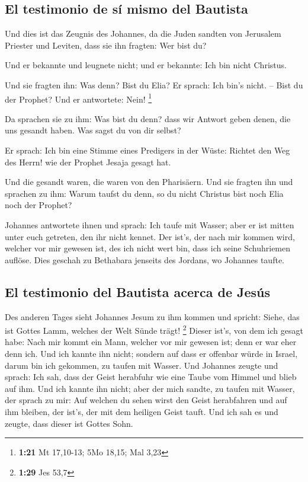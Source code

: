 \hypertarget{el-testimonio-de-suxed-mismo-del-bautista}{%
\subsection{El testimonio de sí mismo del
Bautista}\label{el-testimonio-de-suxed-mismo-del-bautista}}

 Und dies ist das Zeugnis des Johannes, da die Juden
sandten von Jerusalem Priester und Leviten, dass sie ihn fragten: Wer
bist du?

 Und er bekannte und leugnete nicht; und er bekannte: Ich
bin nicht Christus.

 Und sie fragten ihn: Was denn? Bist du Elia? Er sprach:
Ich bin's nicht. -- Bist du der Prophet? Und er antwortete: Nein!
\footnote{\textbf{1:21} Mt 17,10-13; 5Mo 18,15; Mal 3,23}

 Da sprachen sie zu ihm: Was bist du denn? dass wir
Antwort geben denen, die uns gesandt haben. Was sagst du von dir selbst?

 Er sprach: Ich bin eine Stimme eines Predigers in der
Wüste: Richtet den Weg des Herrn! wie der Prophet Jesaja gesagt hat.

 Und die gesandt waren, die waren von den Pharisäern.
 Und sie fragten ihn und sprachen zu ihm: Warum taufst du
denn, so du nicht Christus bist noch Elia noch der Prophet?

 Johannes antwortete ihnen und sprach: Ich taufe mit
Wasser; aber er ist mitten unter euch getreten, den ihr nicht kennet.
 Der ist's, der nach mir kommen wird, welcher vor mir
gewesen ist, des ich nicht wert bin, dass ich seine Schuhriemen auflöse.
 Dies geschah zu Bethabara jenseits des Jordans, wo
Johannes taufte.

\hypertarget{el-testimonio-del-bautista-acerca-de-jesuxfas}{%
\subsection{El testimonio del Bautista acerca de
Jesús}\label{el-testimonio-del-bautista-acerca-de-jesuxfas}}

 Des anderen Tages sieht Johannes Jesum zu ihm kommen und
spricht: Siehe, das ist Gottes Lamm, welches der Welt Sünde trägt!
\footnote{\textbf{1:29} Jes 53,7}  Dieser ist's, von dem
ich gesagt habe: Nach mir kommt ein Mann, welcher vor mir gewesen ist;
denn er war eher denn ich.  Und ich kannte ihn nicht;
sondern auf dass er offenbar würde in Israel, darum bin ich gekommen, zu
taufen mit Wasser.  Und Johannes zeugte und sprach: Ich
sah, dass der Geist herabfuhr wie eine Taube vom Himmel und blieb auf
ihm.  Und ich kannte ihn nicht; aber der mich sandte, zu
taufen mit Wasser, der sprach zu mir: Auf welchen du sehen wirst den
Geist herabfahren und auf ihm bleiben, der ist's, der mit dem heiligen
Geist tauft.  Und ich sah es und zeugte, dass dieser ist
Gottes Sohn.

